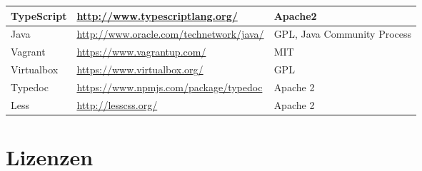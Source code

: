 \begin{landscape}
		\begin{tabularx}{\linewidth}{| l | l | X |}
			\hline
			TypeScript & \url{http://www.typescriptlang.org/} & Apache2 \\
			\hline
			Java & \url{http://www.oracle.com/technetwork/java/} & GPL, Java Community Process\\
			\hline
			Vagrant & \url{https://www.vagrantup.com/} & MIT \\
			\hline
			Virtualbox & \url{https://www.virtualbox.org/} &  GPL \\
			\hline
			Typedoc & \url{https://www.npmjs.com/package/typedoc} &  Apache 2 \\
			\hline
			Less & \url{http://lesscss.org/} &  Apache 2 \\
			\hline
		\end{tabularx}
		
			
	\section{Lizenzen}
	\label{sec:licenses}
	
	\newcommand{\addLicense}[6]{
		#1 & #2 & \url{#3} & #4 & #5 & #6	\\
		\hline
	}


\end{landscape}
